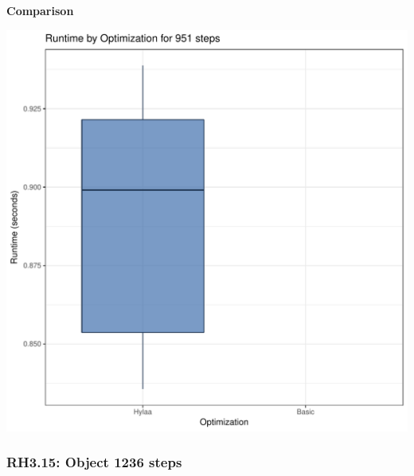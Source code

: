 \documentclass{article}\usepackage[]{graphicx}\usepackage[]{color}
\makeatletter
\def\maxwidth{ %
  \ifdim\Gin@nat@width>\linewidth
    \linewidth
  \else
    \Gin@nat@width
  \fi
}
\newenvironment{knitrout}{}{} %
\makeatother
\begin{document}
 \textbf{Comparison}
  
\begin{knitrout}
\color{fgcolor}
\includegraphics[width=\maxwidth]{figure/RH3_steps951-1} 

\end{knitrout}


\subsubsection{RH3.15: Object 1236 steps}
\end{document}
